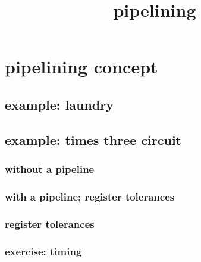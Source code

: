 \graphicspath{{./figures/}}
\title{pipelining}
\date{}
\usepackage{pgfplots}

\usetikzlibrary{calc,chains,shapes.misc,shapes.callouts,shapes.geometric,shapes.gates.logic.US,circuits.logic.US}







\begin{frame}
\titlepage
\end{frame}

\section{pipelining concept}

\subsection{example: laundry}



\subsection{example: times three circuit}


\subsubsection{without a pipeline}



\subsubsection{with a pipeline; register tolerances}



\subsubsection{register tolerances}



\subsubsection{exercise: timing}


